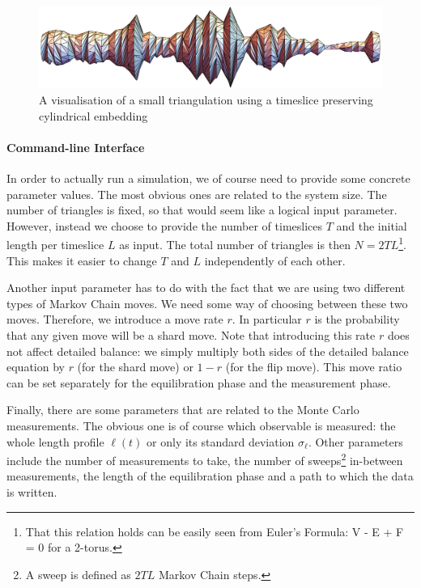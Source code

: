 \begin{figure}[h]
    \centering
    \includegraphics[width=0.98\linewidth]{img/triangulation_visualisation.pdf}
    \caption{A visualisation of a small triangulation using a timeslice preserving cylindrical embedding}
    \label{fig:triangulation_visualisation}
\end{figure}

\paragraph{Command-line Interface}
In order to actually run a simulation, we of course need to provide some concrete parameter values. The most obvious ones are related to the system size. The number of triangles is fixed, so that would seem like a logical input parameter. However, instead we choose to provide the number of timeslices $T$ and the initial length per timeslice $L$ as input. The total number of triangles is then $N = 2 T L$\footnote{That this relation holds can be easily seen from Euler's Formula: V - E + F = 0 for a 2-torus.}. This makes it easier to change $T$ and $L$ independently of each other.

Another input parameter has to do with the fact that we are using two different types of Markov Chain moves. We need some way of choosing between these two moves. Therefore, we introduce a move rate $r$. In particular $r$ is the probability that any given move will be a shard move. Note that introducing this rate $r$ does not affect detailed balance: we simply multiply both sides of the detailed balance equation by $r$ (for the shard move) or $1 - r$ (for the flip move). This move ratio can be set separately for the equilibration phase and the measurement phase.

Finally, there are some parameters that are related to the Monte Carlo measurements. The obvious one is of course which observable is measured: the whole length profile $\ell(t)$ or only its standard deviation $\sigma_\ell$. Other parameters include the number of measurements to take, the number of sweeps\footnote{A sweep is defined as $2 T L$ Markov Chain steps.} in-between measurements, the length of the equilibration phase and a path to which the data is written.



